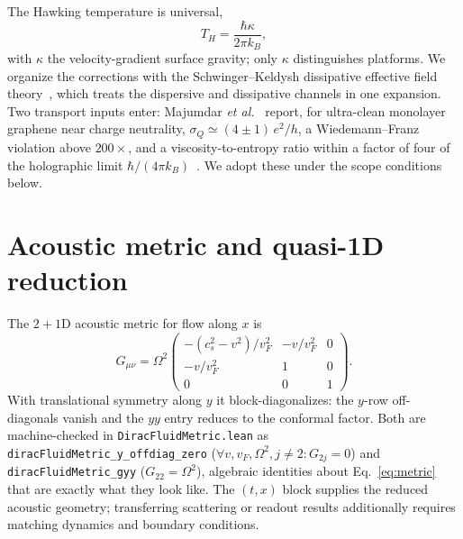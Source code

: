 \documentclass[aps,prl,twocolumn,superscriptaddress,nofootinbib]{revtex4-2}
\begin{document}
The Hawking temperature is universal,
\begin{equation}
T_H = \frac{\hbar \kappa}{2\pi k_B},
\label{eq:T_H}
\end{equation}
with $\kappa$ the velocity-gradient surface gravity; only $\kappa$
distinguishes platforms. We organize the corrections with the
Schwinger--Keldysh dissipative effective field
theory~\cite{CGL2017a,CGL2017b}, which treats the dispersive and
dissipative channels in one expansion. Two transport inputs enter: Majumdar
\emph{et al.}~\cite{Majumdar2025} report, for ultra-clean monolayer
graphene near charge neutrality, $\sigma_Q \simeq (4\pm1)\,e^2/h$, a
Wiedemann--Franz violation above $200\times$, and a viscosity-to-entropy
ratio within a factor of four of the holographic limit
$\hbar/(4\pi k_B)$~\cite{KSS2005,Romatschke2010}. We adopt these under the
scope conditions below.

\section{Acoustic metric and quasi-1D reduction}

The $2{+}1$D acoustic metric for flow along $x$ is~\cite{Bilic1999}
\begin{equation}
G_{\mu\nu} = \Omega^2
\begin{pmatrix}
-(c_s^2 - v^2)/v_F^2 & -v/v_F^2 & 0 \\
-v/v_F^2 & 1 & 0 \\
0 & 0 & 1
\end{pmatrix}.
\label{eq:metric}
\end{equation}
With translational symmetry along $y$ it block-diagonalizes: the $y$-row
off-diagonals vanish and the $yy$ entry reduces to the conformal factor.
Both are machine-checked in \texttt{DiracFluidMetric.lean} as
\texttt{diracFluidMetric\_y\_offdiag\_zero}
($\forall v, v_F, \Omega^2, j \neq 2: G_{2j} = 0$) and
\texttt{diracFluidMetric\_gyy} ($G_{22} = \Omega^2$), algebraic identities
about Eq.~\eqref{eq:metric} that are exactly what they look like.
The $(t,x)$ block supplies the reduced acoustic geometry; transferring
scattering or readout results additionally requires matching dynamics
and boundary conditions.
\end{document}
